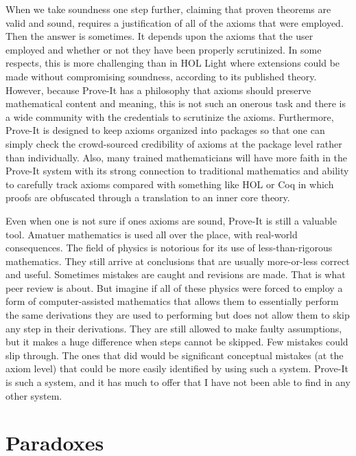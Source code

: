 \documentclass[12pt]{article}
\begin{document}
When we take soundness one step further, claiming that proven theorems are valid and sound, requires a justification of all of the axioms that were employed.  Then the answer is sometimes.  It depends upon the axioms that the user employed and whether or not they have been properly scrutinized.  In some respects, this is more challenging than in HOL Light where extensions could be made without compromising soundness, according to its published theory.  However, because Prove-It has a philosophy that axioms should preserve mathematical content and meaning, this is not such an onerous task and there is a wide community with the credentials to scrutinize the axioms.  Furthermore, Prove-It is designed to keep axioms organized into packages so that one can simply check the crowd-sourced credibility of axioms at the package level rather than individually.  Also, many trained mathematicians will have more faith in the Prove-It system with its strong connection to traditional mathematics and ability to carefully track axioms compared with something like HOL or Coq in which proofs are obfuscated through a translation to an inner core theory.

Even when one is not sure if ones axioms are sound, Prove-It is still a valuable tool.  Amatuer mathematics is used all over the place, with real-world consequences.  The field of physics is notorious for its use of less-than-rigorous mathematics.  They still arrive at conclusions that are usually more-or-less correct and useful.  Sometimes mistakes are caught and revisions are made.  That is what peer review is about.  But imagine if all of these physics were forced to employ a form of computer-assisted mathematics that allows them to essentially perform the same derivations they are used to performing but does not allow them to skip any step in their derivations.  They are still allowed to make faulty assumptions, but it makes a huge difference when steps cannot be skipped.  Few mistakes could slip through.  The ones that did would be significant conceptual mistakes (at the axiom level) that could be more easily identified by using such a system.  Prove-It is such a system, and it has much to offer that I have not been able to find in any other system.

\section{Paradoxes}
\end{document}

